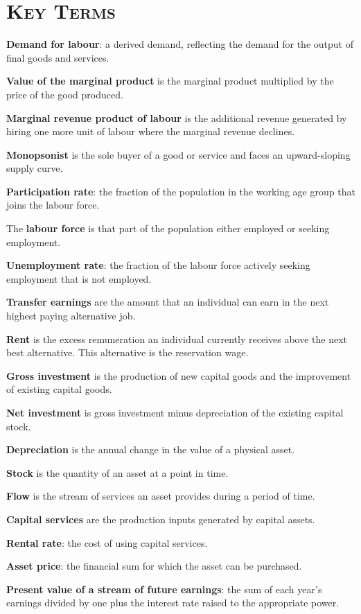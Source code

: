 \newpage
{}
	\section*{\textsc{Key Terms}}
\begin{keyterms}
\textbf{Demand for labour}: a derived demand, reflecting the demand for the output of final goods and services.

\textbf{Value of the marginal product} is the marginal product multiplied by the price of the good produced.

\textbf{Marginal revenue product of labour} is the additional revenue generated by hiring one more unit of labour where the marginal revenue declines.

\textbf{Monopsonist} is the sole buyer of a good or service and faces an upward-sloping supply curve.

\textbf{Participation rate}: the fraction of the population in the working age group that joins the labour force.

The \textbf{labour force} is that part of the population either employed or seeking employment.

\textbf{Unemployment rate}: the fraction of the labour force actively seeking employment that is not employed.

\textbf{Transfer earnings} are the amount that an individual can earn in the next highest paying alternative job.

\textbf{Rent} is the excess remuneration an individual currently receives above the next best alternative. This alternative is the reservation wage.

\textbf{Gross investment} is the production of new capital goods and the improvement of existing capital goods.

\textbf{Net investment} is gross investment minus depreciation of the existing capital stock.

\textbf{Depreciation} is the annual change in the value of a physical asset.

\textbf{Stock} is the quantity of an asset at a point in time.

\textbf{Flow} is the stream of services an asset provides during a period of time.

\textbf{Capital services} are the production inputs generated by capital assets.

\textbf{Rental rate}: the cost of using capital services.

\textbf{Asset price}: the financial sum for which the asset can be purchased.

\textbf{Present value of a stream of future earnings}: the sum of each year's earnings divided by one plus the interest rate raised to the appropriate power.
\end{keyterms}